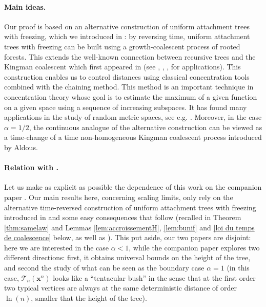 \documentclass[11pt]{article}
\theoremstyle{plain}
\theoremstyle{definition}
\theoremstyle{remark}
\newcommand{\1}{\mathbbm{1}} %
\newcommand{\T}{\mathcal{T}} %
\newcommand{\Xb}{\mathrm{\mathbf{x}}} %
\begin{document}
\paragraph{{Main ideas.}}
Our proof is based on an alternative construction of uniform attachment trees with freezing, which we introduced in \cite{BBKK23+}: by reversing time,  uniform attachment trees with freezing can be built using a growth-coalescent process of rooted forests. This extends the well-known connection between recursive trees and the Kingman coalescent {which first appeared in \cite{DR76} (see \cite[Sec.~6]{Dev87}, \cite[Sec.~3]{Pit94}, \cite[Sec.~2.2]{AB15}, \cite{ABE18,Esl21,Esl22} for applications)}. This construction enables us to control distances using classical concentration tools combined with the chaining method. This method is an important technique in concentration theory \cite{Tal05} whose goal is to estimate the maximum of a given function on a given space using a sequence of increasing subspaces. It has found many applications in the study of random metric spaces, see e.g. \cite{Ald91,ADGO17,CH17,Sen19,Bla22,Bla22+}. Moreover, in the case $\alpha=1/2$, the continuous analogue of the alternative construction can be viewed as a time-change of a time non-homogeneous Kingman coalescent process introduced by Aldous.

\paragraph{{{Relation with \cite{BBKK23+}.}}} {Let us make as explicit as possible the dependence of this work on the companion paper \cite{BBKK23+}. Our main results here, concerning scaling limits, only rely on the alternative time-reversed construction of uniform attachment trees with freezing introduced in \cite{BBKK23+} and some easy consequences that follow (recalled in Theorem \ref{thm:samelaw} and Lemmas \ref{lem:accroissementH}, \ref{lem:bunif} and \ref{loi du temps de coalescence} below, as well as \cite[Theorem 3 (3)]{BBKK23+}). This put aside, our two papers are disjoint: here we are interested in the case $\alpha<1$, while the companion paper \cite{BBKK23+} explores two different directions: first, it obtains universal bounds on the height of the tree, and second the study of what can be seen as the boundary case $\alpha=1$ (in this case, $\T_{n}(\Xb^{n})$ looks like a ``{tentacular} bush'' in the sense that {at the first order }two typical vertices are always at the same {deterministic} distance of order
 $\ln(n)$, {smaller that the height of the tree}).
} 
\end{document}
